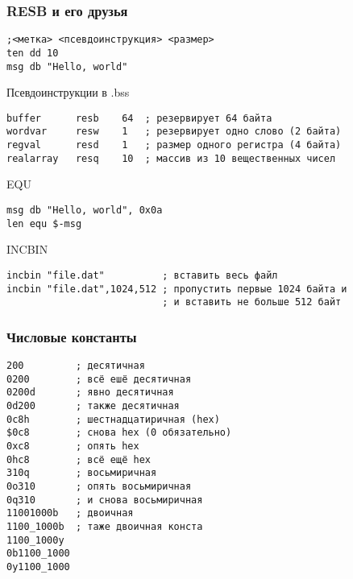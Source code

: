 \documentclass{beamer}
\begin{document}
    \begin{frame}[fragile]
        \frametitle{RESB и его друзья}\small
        \begin{verbatim}
;<метка> <псевдоинструкция> <размер> 
ten dd 10 
msg db "Hello, world"\end{verbatim}
        \begin{block}{Псевдоинструкции в .bss}
            \begin{verbatim}
buffer      resb    64  ; резервирует 64 байта
wordvar     resw    1   ; резервирует одно слово (2 байта)
regval      resd    1   ; размер одного регистра (4 байта)
realarray   resq    10  ; массив из 10 вещественных чисел\end{verbatim}
        \end{block}
        \begin{block}{EQU}
        \begin{verbatim}
msg db "Hello, world", 0x0a
len equ $-msg\end{verbatim}
        \end{block}
        \begin{block}{INCBIN}
        \begin{verbatim}
incbin "file.dat"          ; вставить весь файл
incbin "file.dat",1024,512 ; пропустить первые 1024 байта и
                           ; и вставить не больше 512 байт\end{verbatim}
        \end{block}
\end{frame}
    \begin{block}[fragile]
        \frametitle{Числовые константы}
        \begin{verbatim}
200         ; десятичная
0200        ; всё ешё десятичная
0200d       ; явно десятичная
0d200       ; также десятичная
0c8h        ; шестнадцатиричная (hex)
$0c8        ; снова hex (0 обязательно)
0xc8        ; опять hex
0hc8        ; всё ещё hex
310q        ; восьмиричная
0o310       ; опять восьмиричная
0q310       ; и снова восьмиричная
11001000b   ; двоичная
1100_1000b  ; таже двоичная конста
1100_1000y
0b1100_1000
0y1100_1000        
        \end{verbatim}
    \end{block}
\end{document}
